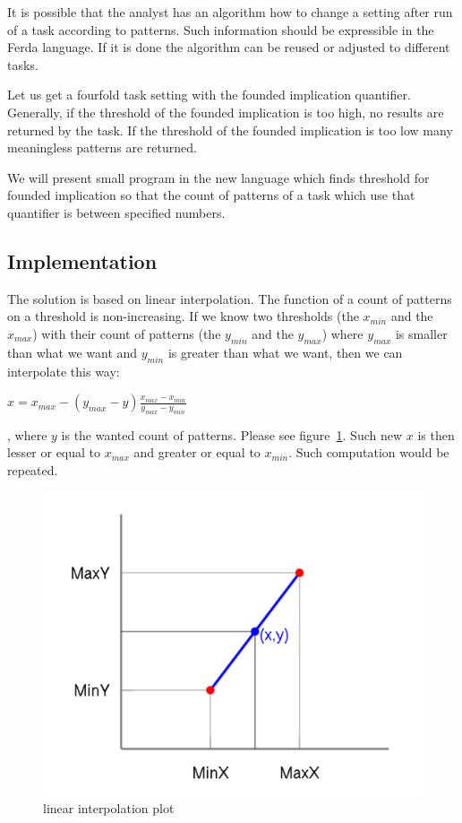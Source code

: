 \documentclass[a4paper,12pt]{book}
\begin{document}
It is possible that the analyst has an algorithm how to change a setting after run of a task according to patterns. Such information should be expressible in the Ferda language. If it is done the algorithm can be reused or adjusted to different tasks.

Let us get a fourfold task setting with the founded implication quantifier. Generally, if the threshold of the founded implication is too high, no results are returned by the task. If the threshold of the founded implication is too low many meaningless patterns are returned.

We will present small program in the new language which finds threshold for founded implication so that the count of patterns of a task which use that quantifier is between specified numbers.

\subsection{Implementation}
The solution is based on linear interpolation. The function of a count of patterns on a threshold is non-increasing. If we know two thresholds (the $x_{min}$ and the $x_{max}$) with their count of patterns (the $y_{min}$ and the $y_{max}$) where $y_{max}$ is smaller than what we want and $y_{min}$ is greater than what we want, then we can interpolate this way: 

\begin{math}
x = x_{max} - (y_{max} - y)\frac{x_{max} - x_{min}}{y_{max} - y_{min}}
\end{math}

, where $y$ is the wanted count of patterns. Please see figure~\ref{fig:linearInterpolationPlot}. Such new $x$ is then lesser or equal to $x_{max}$ and greater or equal to $x_{min}$. Such computation would be repeated.

\begin{figure}
	\includegraphics[width=1\textwidth]{linearInterpolationPlot}
	\caption{linear interpolation plot}
	\label{fig:linearInterpolationPlot}
\end{figure}
\end{document}
